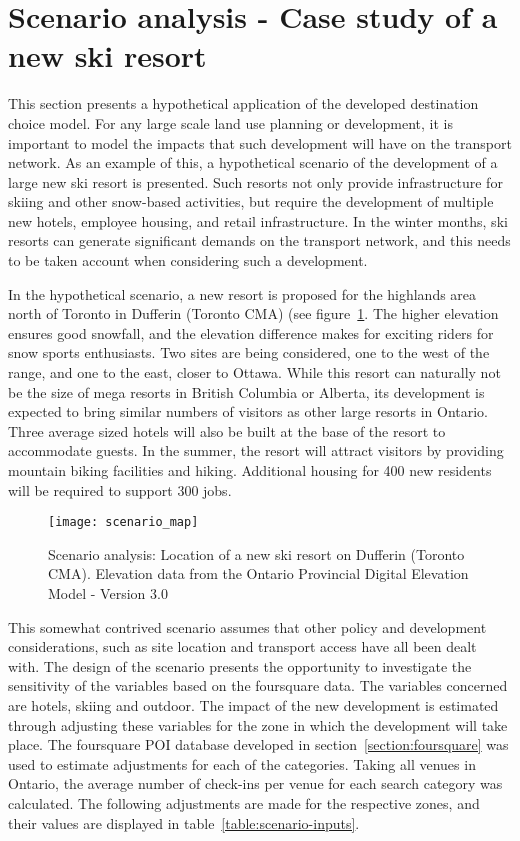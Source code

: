 \section{Scenario analysis - Case study of a new ski resort}
\label{scenario-analysis}

This section presents a hypothetical application of the developed destination choice model. For any large scale land use planning or development, it is important to model the impacts that such development will have on the transport network. As an example of this, a hypothetical scenario of the development of a large new ski resort is presented. Such resorts not only provide infrastructure for skiing and other snow-based activities, but require the development of multiple new hotels, employee housing, and retail infrastructure. In the winter months, ski resorts can generate significant demands on the transport network, and this needs to be taken account when considering such a development.

In the hypothetical scenario, a new resort is proposed for the highlands area north of Toronto  in Dufferin (Toronto CMA) (see figure~\ref{fig:scenario-map}. The higher elevation ensures good snowfall, and the elevation difference makes for exciting riders for snow sports enthusiasts. Two sites are being considered, one to the west of the range, and one to the east, closer to Ottawa. While this resort can naturally not be the size of mega resorts in British Columbia or Alberta, its development is expected to bring similar numbers of visitors as other large resorts in Ontario. Three average sized hotels will also be built at the base of the resort to accommodate guests. In the summer, the resort will attract visitors by providing mountain biking facilities and hiking. Additional housing for 400 new residents will be required to support 300 jobs.

\begin{figure}[H]
\centering
\texttt{[image: scenario\_map]}
\caption{Scenario analysis: Location of a new ski resort on Dufferin (Toronto CMA). Elevation data from the Ontario Provincial Digital Elevation Model - Version 3.0 }
\label{fig:scenario-map}
\end{figure}

This somewhat contrived scenario assumes that other policy and development considerations, such as site location and transport access have all been dealt with. The design of the scenario presents the opportunity to investigate the sensitivity of the  variables based on the foursquare data. The variables concerned are hotels, skiing and outdoor. The impact of the new development is estimated through adjusting these variables for the zone in which the development will take place. The foursquare POI database developed in section~\ref{section:foursquare} was used to estimate adjustments for each of the categories. Taking all venues in Ontario, the average number of check-ins per venue for each search category was calculated. The following adjustments are made for the respective zones, and their values are displayed in table~\ref{table:scenario-inputs}.

